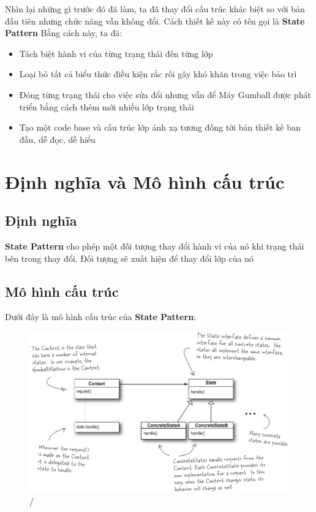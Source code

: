 Nhìn lại những gì trước đó đã làm, ta đã thay đổi cấu trúc khác biệt so với bản đầu tiên nhưng chức năng vẫn không đổi. Cách thiết kế này có tên gọi là \textbf{State Pattern} Bằng cách này, ta đã:

\begin{itemize}
    \item Tách biệt hành vi của từng trạng thái đến từng lớp
    \item Loại bỏ tất cả biểu thức điều kiện rắc rối gây khó khăn trong việc bảo trì
    \item Đóng từng trạng thái cho việc sửa đổi nhưng vẫn để Máy Gumball được phát triển bằng cách thêm mới nhiều lớp trạng thái
    \item Tạo một code base và cấu trúc lớp ánh xạ tương đồng tới bản thiết kế ban đầu, dễ đọc, dễ hiểu
\end{itemize}

\section{Định nghĩa và Mô hình cấu trúc}
\subsection{Định nghĩa}
\textbf{State Pattern} cho phép một đối tượng thay đổi hành vi của nó khi trạng thái bên trong thay đổi. Đối tượng sẽ xuất hiện để thay đổi lớp của nó
\subsection{Mô hình cấu trúc}
Dưới đây là mô hình cấu trúc của \textbf{State Pattern}:
\begin{figure}[!htb]
    \centering
    \includegraphics[width=\textwidth]{fig/State/StateDiagram.png}/
\end{figure}


